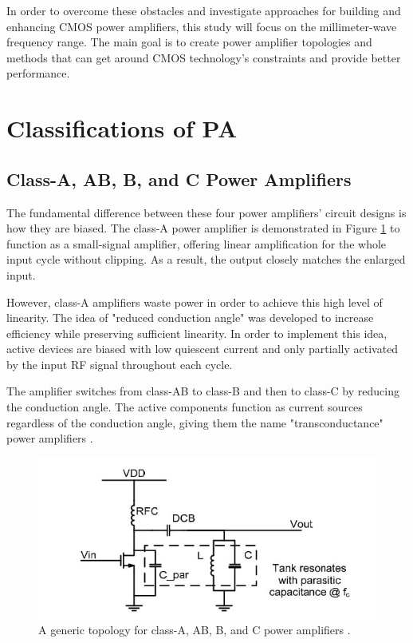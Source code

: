 In order to overcome these obstacles and investigate approaches for building and enhancing CMOS power amplifiers, this study will focus on the millimeter-wave frequency range. The main goal is to create power amplifier topologies and methods that can get around CMOS technology's constraints and provide better performance.

\section{Classifications of PA}
\subsection{Class-A, AB, B, and C Power Amplifiers}
The fundamental difference between these four power amplifiers' circuit designs is how they are biased. The class-A power amplifier is demonstrated in Figure \ref{fig:general-topology-PA} to function as a small-signal amplifier, offering linear amplification for the whole input cycle without clipping. As a result, the output closely matches the enlarged input.

However, class-A amplifiers waste power in order to achieve this high level of linearity. The idea of "reduced conduction angle" was developed to increase efficiency while preserving sufficient linearity. In order to implement this idea, active devices are biased with low quiescent current and only partially activated by the input RF signal throughout each cycle.

The amplifier switches from class-AB to class-B and then to class-C by reducing the conduction angle. The active components function as current sources regardless of the conduction angle, giving them the name "transconductance" power amplifiers \cite{twelveth}.

\begin{figure}[h]
    \centering
    \includegraphics{figures/general-A-B-AB-C.jpeg}
    \caption{A generic topology for class-A, AB, B, and C power amplifiers \cite{twelveth}.}
    \label{fig:general-topology-PA}
\end{figure}

